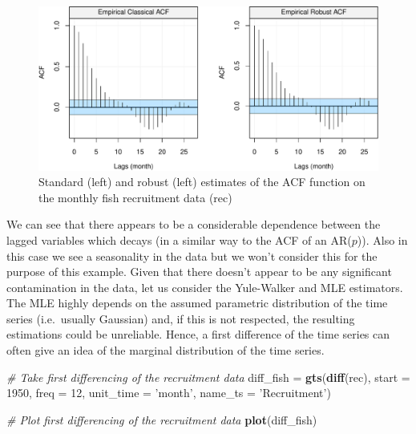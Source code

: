 \documentclass[]{book}
\newenvironment{Shaded}{\begin{snugshade}}{\end{snugshade}}
\newcommand{\KeywordTok}[1]{\textcolor[rgb]{0.13,0.29,0.53}{\textbf{#1}}}
\newcommand{\DataTypeTok}[1]{\textcolor[rgb]{0.13,0.29,0.53}{#1}}
\newcommand{\DecValTok}[1]{\textcolor[rgb]{0.00,0.00,0.81}{#1}}
\newcommand{\StringTok}[1]{\textcolor[rgb]{0.31,0.60,0.02}{#1}}
\newcommand{\CommentTok}[1]{\textcolor[rgb]{0.56,0.35,0.01}{\textit{#1}}}
\newcommand{\NormalTok}[1]{#1}
\theoremstyle{definition}
\theoremstyle{definition}
\theoremstyle{definition}
\theoremstyle{remark}
\begin{document}
\begin{figure}

{\centering \includegraphics{ts_files/figure-latex/unnamed-chunk-36-1} 

}

\caption{Standard (left) and robust (left) estimates of the ACF function on the monthly fish recruitment data (rec)}\label{fig:unnamed-chunk-36}
\end{figure}

We can see that there appears to be a considerable dependence between
the lagged variables which decays (in a similar way to the ACF of an
AR(\(p\))). Also in this case we see a seasonality in the data but we
won't consider this for the purpose of this example. Given that there
doesn't appear to be any significant contamination in the data, let us
consider the Yule-Walker and MLE estimators. The MLE highly depends on
the assumed parametric distribution of the time series (i.e.~usually
Gaussian) and, if this is not respected, the resulting estimations could
be unreliable. Hence, a first difference of the time series can often
give an idea of the marginal distribution of the time series.

\begin{Shaded}
\begin{Highlighting}[]
\CommentTok{# Take first differencing of the recruitment data}
\NormalTok{diff_fish =}\StringTok{ }\KeywordTok{gts}\NormalTok{(}\KeywordTok{diff}\NormalTok{(rec), }\DataTypeTok{start =} \DecValTok{1950}\NormalTok{, }\DataTypeTok{freq =} \DecValTok{12}\NormalTok{, }\DataTypeTok{unit_time =} \StringTok{'month'}\NormalTok{, }\DataTypeTok{name_ts =} \StringTok{'Recruitment'}\NormalTok{)}

\CommentTok{# Plot first differencing of the recruitment data}
\KeywordTok{plot}\NormalTok{(diff_fish)}
\end{Highlighting}
\end{Shaded}
\end{document}

